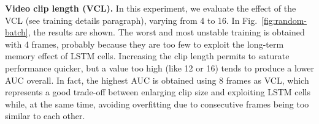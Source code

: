 
\noindent\textbf{Video clip length (VCL).}
In this experiment, we evaluate the effect of the VCL (see training details paragraph), varying from 4 to 16.
In Fig.~\ref{fig:random-batch}, the results are shown.
The worst and most unstable training is obtained with 4 frames, probably because they are too few to exploit the long-term memory effect of LSTM cells.
Increasing the clip length permits to saturate performance quicker, but a value too high (like 12 or 16) tends to produce a lower AUC overall.
In fact, the highest AUC is obtained using 8 frames as VCL, which represents a good trade-off between enlarging clip size and exploiting LSTM cells while, at the same time, avoiding overfitting due to consecutive frames being too similar to each other.

